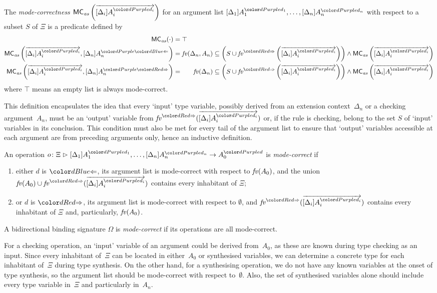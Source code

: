 \begin{definition}\label{def:mode-correctness-args}
  The \emph{mode-correctness} $\MCas\left(\biargvec\right)$ for an argument list $\biargs$ with respect to a subset $S$ of $\Xi$ is a predicate defined by
  \begin{align*}
    \MCas( \cdot ) & = \top \\
    \MCas\left(\biargvec, \chkbiarg[n]\right)
                                  & = \fv(\Delta_n, A_n) \subseteq \left( S \cup \synvar\left(\biargvec\right)\right) \land \MCas\left(\biargvec\right) \\
    \label{eq:MC2} \MCas\left(\biargvec, \synbiarg[n]\right) 
                                  & = \phantom{, A_n} \fv(\Delta_n) \subseteq \left( S \cup \synvar\left(\biargvec\right)\right) \land  \MCas\left(\biargvec\right)
  \end{align*}
  where $\top$ means an empty list is always mode-correct.
\end{definition}
This definition encapsulates the idea that every `input' type variable, possibly derived from an extension context~$\Delta_n$ or a checking argument~$A_n$, must be an `output' variable from $\synvar(\biargvec)$ or, if the rule is checking, belong to the set $S$ of `input' variables in its conclusion.
This condition must also be met for every tail of the argument list to ensure that `output' variables accessible at each argument are from preceding arguments only, hence an inductive definition.
\begin{definition}\label{def:mode-correctness}
  An operation $\biop$ is \emph{mode-correct} if 
  \begin{enumerate}
    \item either $d$ is $\chk$, its argument list is mode-correct with respect to $\mathit{fv}(A_0)$, and the union $\fv(A_0) \cup \synvar(\biargvec)$ contains every inhabitant of $\Xi$;
    \item or $d$ is $\syn$, its argument list is mode-correct with respect to $\emptyset$, and $\synvar(\biargvec)$ contains every inhabitant of $\Xi$ and, particularly, $\mathit{fv}(A_0)$.
  \end{enumerate}
  A bidirectional binding signature $\Omega$ is \emph{mode-correct} if its operations are all mode-correct.
\end{definition}
For a checking operation, an `input' variable of an argument could be derived from~$A_0$, as these are known during type checking as an input.
Since every inhabitant of~$\Xi$ can be located in either~$A_0$ or synthesised variables, we can determine a concrete type for each inhabitant of~$\Xi$ during type synthesis.
On the other hand, for a synthesising operation, we do not have any known variables at the onset of type synthesis, so the argument list should be mode-correct with respect to~$\emptyset$.
Also, the set of synthesised variables alone should include every type variable in~$\Xi$ and particularly in~$A_n$.

